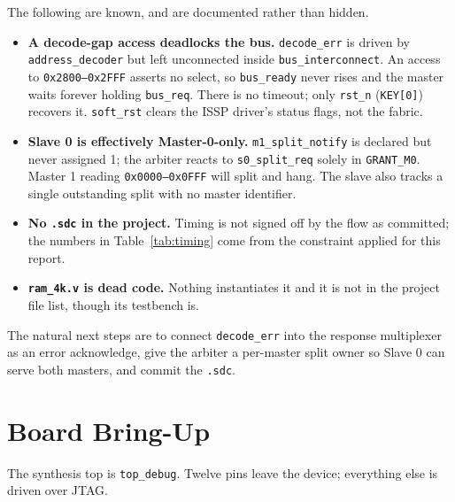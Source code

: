 \documentclass[11pt,a4paper]{article}
\newcommand{\sig}[1]{\texttt{#1}}
\begin{document}
The following are known, and are documented rather than hidden.

\begin{itemize}
    \item \textbf{A decode-gap access deadlocks the bus.} \sig{decode\_err} is
          driven by \sig{address\_decoder} but left unconnected inside
          \sig{bus\_interconnect}. An access to \texttt{0x2800--0x2FFF} asserts
          no select, so \sig{bus\_ready} never rises and the master waits
          forever holding \sig{bus\_req}. There is no timeout; only \sig{rst\_n}
          (\texttt{KEY[0]}) recovers it. \sig{soft\_rst} clears the ISSP
          driver's status flags, not the fabric.
    \item \textbf{Slave 0 is effectively Master-0-only.}
          \sig{m1\_split\_notify} is declared but never assigned 1; the arbiter
          reacts to \sig{s0\_split\_req} solely in \sig{GRANT\_M0}. Master 1
          reading \texttt{0x0000--0x0FFF} will split and hang. The slave also
          tracks a single outstanding split with no master identifier.
    \item \textbf{No \sig{.sdc} in the project.} Timing is not signed off by the
          flow as committed; the numbers in Table~\ref{tab:timing} come from the
          constraint applied for this report.
    \item \textbf{\sig{ram\_4k.v} is dead code.} Nothing instantiates it and it
          is not in the project file list, though its testbench is.
\end{itemize}

The natural next steps are to connect \sig{decode\_err} into the response
multiplexer as an error acknowledge, give the arbiter a per-master split owner
so Slave 0 can serve both masters, and commit the \sig{.sdc}.

\section{Board Bring-Up}

The synthesis top is \sig{top\_debug}. Twelve pins leave the device; everything
else is driven over JTAG.
\end{document}
